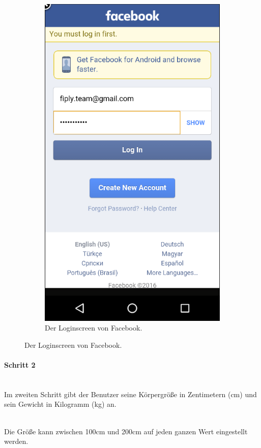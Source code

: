 \documentclass[FIPLY_base.tex]{subfiles}
\begin{document}
\begin{figure}[H]
\begin{subfigure}[b]{0.6\textwidth}
		\includegraphics[scale=0.53]{img/User_facebooklogin}
		\caption{Der Loginscreen von Facebook.}
	\end{subfigure}
\end{figure}
\paragraph{Schritt 2}\ \\
Im zweiten Schritt gibt der Benutzer seine Körpergröße in Zentimetern (cm) und sein Gewicht in Kilogramm (kg) an.

\ \\
Die Größe kann zwischen 100cm und 200cm auf jeden ganzen Wert eingestellt werden.
\end{document}
